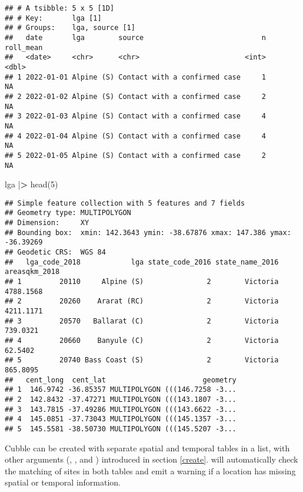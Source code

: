 \documentclass{article}
\newenvironment{Shaded}{\begin{snugshade}}{\end{snugshade}}
\newcommand{\DecValTok}[1]{\textcolor[rgb]{0.00,0.00,0.81}{#1}}
\newcommand{\ErrorTok}[1]{\textcolor[rgb]{0.64,0.00,0.00}{\textbf{#1}}}
\newcommand{\FunctionTok}[1]{\textcolor[rgb]{0.00,0.00,0.00}{#1}}
\newcommand{\NormalTok}[1]{#1}
\newcommand{\SpecialCharTok}[1]{\textcolor[rgb]{0.00,0.00,0.00}{#1}}
\begin{document}
\begin{verbatim}
## # A tsibble: 5 x 5 [1D]
## # Key:       lga [1]
## # Groups:    lga, source [1]
##   date       lga        source                            n roll_mean
##   <date>     <chr>      <chr>                         <int>     <dbl>
## 1 2022-01-01 Alpine (S) Contact with a confirmed case     1        NA
## 2 2022-01-02 Alpine (S) Contact with a confirmed case     2        NA
## 3 2022-01-03 Alpine (S) Contact with a confirmed case     4        NA
## 4 2022-01-04 Alpine (S) Contact with a confirmed case     4        NA
## 5 2022-01-05 Alpine (S) Contact with a confirmed case     2        NA
\end{verbatim}

\begin{Shaded}
\begin{Highlighting}[]
\NormalTok{lga }\SpecialCharTok{|}\ErrorTok{\textgreater{}} \FunctionTok{head}\NormalTok{(}\DecValTok{5}\NormalTok{)}
\end{Highlighting}
\end{Shaded}

\begin{verbatim}
## Simple feature collection with 5 features and 7 fields
## Geometry type: MULTIPOLYGON
## Dimension:     XY
## Bounding box:  xmin: 142.3643 ymin: -38.67876 xmax: 147.386 ymax: -36.39269
## Geodetic CRS:  WGS 84
##   lga_code_2018            lga state_code_2016 state_name_2016 areasqkm_2018
## 1         20110     Alpine (S)               2        Victoria     4788.1568
## 2         20260    Ararat (RC)               2        Victoria     4211.1171
## 3         20570   Ballarat (C)               2        Victoria      739.0321
## 4         20660    Banyule (C)               2        Victoria       62.5402
## 5         20740 Bass Coast (S)               2        Victoria      865.8095
##   cent_long  cent_lat                       geometry
## 1  146.9742 -36.85357 MULTIPOLYGON (((146.7258 -3...
## 2  142.8432 -37.47271 MULTIPOLYGON (((143.1807 -3...
## 3  143.7815 -37.49286 MULTIPOLYGON (((143.6622 -3...
## 4  145.0851 -37.73043 MULTIPOLYGON (((145.1357 -3...
## 5  145.5581 -38.50730 MULTIPOLYGON (((145.5207 -3...
\end{verbatim}

Cubble can be created with separate spatial and temporal tables in a list, with other arguments (, , and ) introduced in section \ref{create}.  will automatically check the matching of sites in both tables and emit a warning if a location has missing spatial or temporal information.
\end{document}
